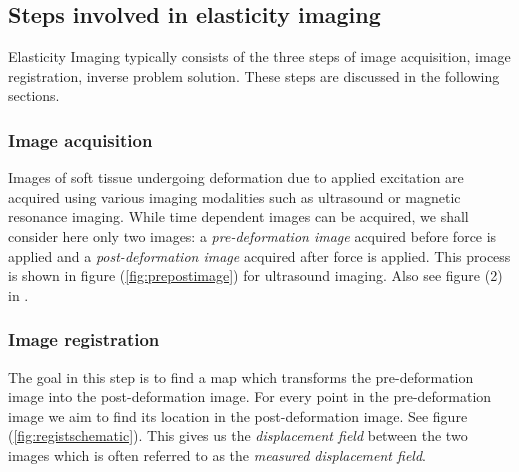 \documentclass[12pt]{article}
\begin{document}
\subsection{Steps involved in elasticity imaging}
Elasticity Imaging typically consists of the three steps of image acquisition, image registration, inverse problem solution. These steps are discussed in the following sections.
\subsubsection{Image acquisition} Images of soft tissue undergoing deformation due to applied excitation are acquired using various imaging modalities such as ultrasound or magnetic resonance imaging. While time dependent images can be acquired, we shall consider here only two images: a \textit{pre-deformation image} acquired before force is applied and a \textit{post-deformation image} acquired after force is applied. This process is shown in figure (\ref{fig:prepostimage}) for ultrasound imaging. Also see figure (2) in \cite{paper:konofagou2004}.
\subsubsection{Image registration} The goal in this step is to find a map which transforms the pre-deformation image into the post-deformation image. For every point in the pre-deformation image we aim to find its location in the post-deformation image. See figure (\ref{fig:registschematic}). This gives us the \textit{displacement field} between the two images which is often referred to as the \textit{measured displacement field}.
\end{document}

